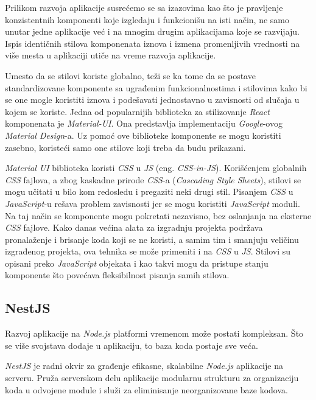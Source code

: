 Prilikom razvoja aplikacije susrećemo se sa izazovima kao što je pravljenje konzistentnih komponenti koje izgledaju i funkcionišu 
na isti način, ne samo unutar jedne aplikacije već i na mnogim drugim aplikacijama koje se razvijaju. Ispis identičnih stilova 
komponenata iznova i izmena promenljivih vrednosti na više mesta u aplikaciji utiče na vreme razvoja aplikacije.

Umesto da se stilovi koriste globalno, teži se ka tome da se postave standardizovane komponente sa ugrađenim funkcionalnostima i 
stilovima kako bi se one mogle koristiti iznova i podešavati jednostavno u zavisnosti od slučaja u kojem se koriste.
Jedna od popularnijih biblioteka za stilizovanje \textit{React} komponenata je \textit{Material-UI}. Ona predstavlja 
implementaciju \textit{Google}-ovog \textit{Material Design}-a. Uz pomoć ove biblioteke komponente se mogu koristiti zasebno, 
koristeći samo one stilove koji treba da budu prikazani.

\textit{Material UI} biblioteka koristi \textit{CSS} u \textit{JS} (eng. \textit{CSS-in-JS}). Korišćenjem globalnih \textit{CSS} 
fajlova, a zbog kaskadne prirode \textit{CSS}-a (\textit{Cascading Style Sheets}), stilovi se mogu učitati u bilo kom redosledu 
i pregaziti neki drugi stil. Pisanjem \textit{CSS} u \textit{JavaScript}-u rešava problem zavisnosti jer se mogu koristiti 
\textit{JavaScript} moduli. Na taj način se komponente mogu pokretati nezavisno, bez oslanjanja na eksterne \textit{CSS} fajlove. 
Kako danas većina alata za izgradnju projekta podržava pronalaženje i brisanje koda koji se ne koristi, a samim tim i smanjuju 
veličinu izgrađenog projekta, ova tehnika se može primeniti i na \textit{CSS} u \textit{JS}. Stilovi su opisani preko 
\textit{JavaScript} objekata i kao takvi mogu da pristupe stanju komponente što povećava fleksibilnost pisanja samih stilova.


\subsection{NestJS}\label{sec:nestjs}
Razvoj aplikacije na \textit{Node.js} platformi vremenom može postati kompleksan. Što se više svojstava 
dodaje u aplikaciju, to baza koda postaje sve veća.

\textit{NestJS} je radni okvir za građenje efikasne, skalabilne \textit{Node.js} aplikacije na serveru. 
Pruža serverskom delu aplikacije modularnu strukturu za organizaciju koda u odvojene module i služi 
za eliminisanje neorganizovane baze kodova.


